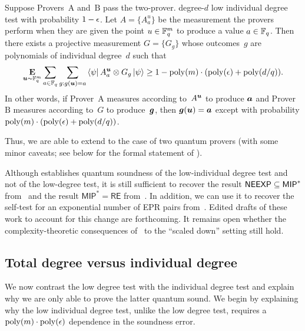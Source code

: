 \begin{theorem}\label{thm:main-informal}
Suppose Provers~$\mathrm{A}$ and~$\mathrm{B}$
pass the two-prover. degree-$d$ low individual degree test with probability $1-\epsilon$.
Let $A = \{A^u_a\}$ be the measurement the provers perform when they are given the point $u \in \mathbb F_q^m$
to produce a value $a \in \mathbb F_q$.
Then there exists a projective measurement $G = \{G_g\}$
whose outcomes~$g$ are polynomials of individual degree~$d$
such that
\begin{equation*}
\mathop{\bf E\/}_{\boldsymbol{u} \sim \mathbb F_q^m}\sum_{a \in \mathbb F_q} \sum_{g:g(\boldsymbol{u}) = a} \bra{\psi} A^{\boldsymbol{u}}_{a} \otimes G_g \ket{\psi}
\geq 1 - \mathrm{poly}(m) \cdot (\mathrm{poly}(\epsilon) + \mathrm{poly}(d/q)).
\end{equation*}
In other words, if Prover~$\mathrm{A}$ measures according to~$A^{\boldsymbol{u}}$ to produce $\boldsymbol{a}$ and Prover~$\mathrm{B}$ measures according to~$G$ to produce~$\boldsymbol{g}$,
then $\boldsymbol{g}(\boldsymbol{u}) = \boldsymbol{a}$ except with probability $\mathrm{poly}(m) \cdot (\mathrm{poly}(\epsilon) + \mathrm{poly}(d/q))$.
\end{theorem}
\noindent
Thus, we are able to extend 
to the case of two quantum provers (with some minor caveats; see  below for the formal statement of ).

Although  establishes quantum soundness of the low-individual degree test
and not of the low-degree test, it is still sufficient to recover the result $\mathsf{NEEXP} \subseteq \mathsf{MIP}^*$
from~\cite{NW19}
and the result $\mathsf{MIP}^* = \mathsf{RE}$ from~\cite{JNV+20}.
In addition,
we can use it to recover the self-test for an exponential number of EPR pairs from~\cite{NV18a}.
Edited drafts of these work to account for this change are forthcoming.
It remains open whether the complexity-theoretic consequences
of~\cite{Vid16,NV18b,NV18a} to the ``scaled down'' setting still hold.

\subsection{Total degree versus individual degree}

We now contrast the low degree test with the individual degree test
and explain why we are only able to prove the latter quantum sound.
We begin by explaining why the low individual degree test,
unlike the low degree test,
requires a $\mathrm{poly}(m) \cdot \mathrm{poly}(\epsilon)$ dependence in the soundness error.

